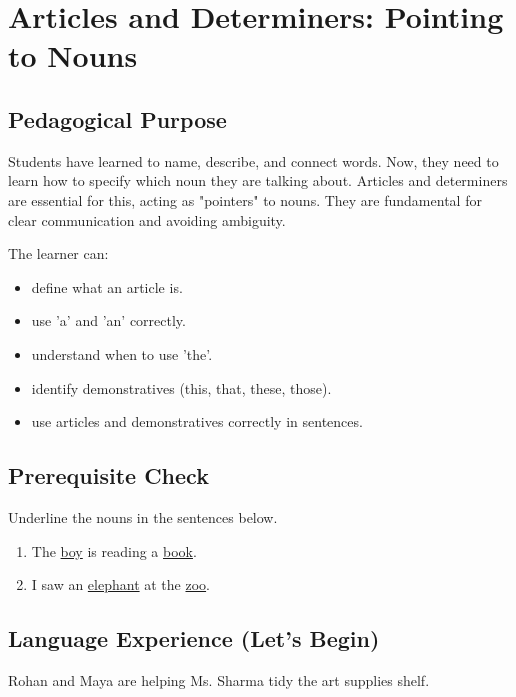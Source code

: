 
\chapter{Articles and Determiners: Pointing to Nouns}

\section{Pedagogical Purpose}
Students have learned to name, describe, and connect words. Now, they need to learn how to specify which noun they are talking about. Articles and determiners are essential for this, acting as "pointers" to nouns. They are fundamental for clear communication and avoiding ambiguity.

\begin{learningobjectives}
The learner can:
\begin{itemize}
    \item define what an article is.
    \item use 'a' and 'an' correctly.
    \item understand when to use 'the'.
    \item identify demonstratives (this, that, these, those).
    \item use articles and demonstratives correctly in sentences.
\end{itemize}
\end{learningobjectives}

\section{Prerequisite Check}
\begin{quickcheck}
Underline the nouns in the sentences below.
\begin{enumerate}
    \item The \underline{boy} is reading a \underline{book}.
    \item I saw an \underline{elephant} at the \underline{zoo}.
\end{enumerate}
\end{quickcheck}

\section{Language Experience (Let's Begin)}
Rohan and Maya are helping Ms. Sharma tidy the art supplies shelf.

